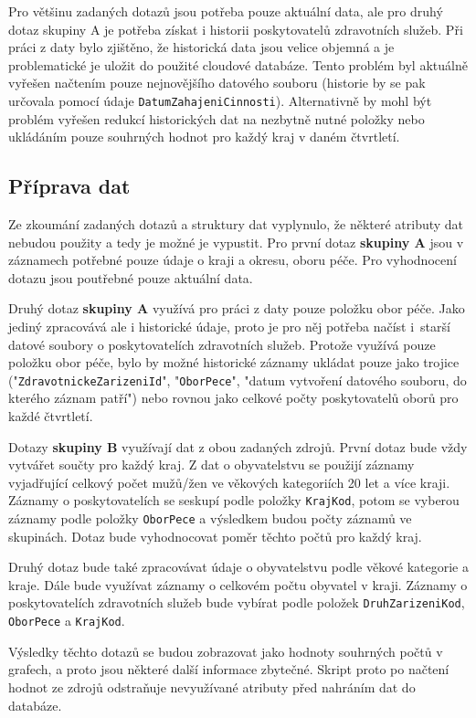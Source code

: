 \documentclass[11pt, a4paper]{article}
\theoremstyle{definition}
\theoremstyle{plain}
\begin{document}
Pro většinu zadaných dotazů jsou potřeba pouze aktuální data, ale pro druhý dotaz skupiny A je potřeba získat i historii poskytovatelů zdravotních služeb. Při práci z daty bylo zjištěno, že historická data jsou velice objemná a je problematické je uložit do použité cloudové databáze. Tento problém byl aktuálně vyřešen načtením pouze nejnovějšího datového souboru (historie by se pak určovala pomocí údaje \texttt{DatumZahajeniCinnosti}). Alternativně by mohl být problém vyřešen redukcí historických dat na nezbytně nutné položky nebo ukládáním pouze souhrných hodnot pro každý kraj v daném čtvrtletí.

\subsection{Příprava dat}
Ze zkoumání zadaných dotazů a struktury dat vyplynulo, že některé atributy dat nebudou použity a tedy je možné je vypustit. Pro první dotaz \textbf{skupiny A} jsou v záznamech potřebné pouze údaje o kraji a okresu, oboru péče. Pro vyhodnocení dotazu jsou poutřebné pouze aktuální data.

Druhý dotaz \textbf{skupiny A} využívá pro práci z daty pouze položku obor péče. Jako jediný zpracovává ale i historické údaje, proto je pro něj potřeba načíst i~starší datové soubory o poskytovatelích zdravotních služeb. Protože využívá pouze položku obor péče, bylo by možné historické záznamy ukládat pouze jako trojice ("\texttt{ZdravotnickeZarizeniId}", "\texttt{OborPece}", "datum vytvoření datového souboru, do kterého záznam patří") nebo rovnou jako celkové počty poskytovatelů oborů pro každé čtvrtletí.

Dotazy \textbf{skupiny B} využívají dat z obou zadaných zdrojů. První dotaz bude vždy vytvářet součty pro každý kraj. Z dat o obyvatelstvu se použijí záznamy vyjadřující celkový počet mužů/žen ve věkových kategoriích 20 let a více kraji. Záznamy o poskytovatelích se seskupí podle položky \texttt{KrajKod}, potom se vyberou záznamy podle položky \texttt{OborPece} a výsledkem budou počty záznamů ve skupinách. Dotaz bude vyhodnocovat poměr těchto počtů pro každý kraj.

Druhý dotaz bude také zpracovávat údaje o obyvatelstvu podle věkové kategorie a kraje. Dále bude využívat záznamy o celkovém počtu obyvatel v kraji. Záznamy o poskytovatelích zdravotních služeb bude vybírat podle položek \texttt{DruhZarizeniKod}, \texttt{OborPece} a \texttt{KrajKod}.

Výsledky těchto dotazů se budou zobrazovat jako hodnoty souhrných počtů v grafech, a proto jsou některé další informace zbytečné. Skript proto po načtení hodnot ze zdrojů odstraňuje nevyužívané atributy před nahráním dat do databáze.
\end{document}
